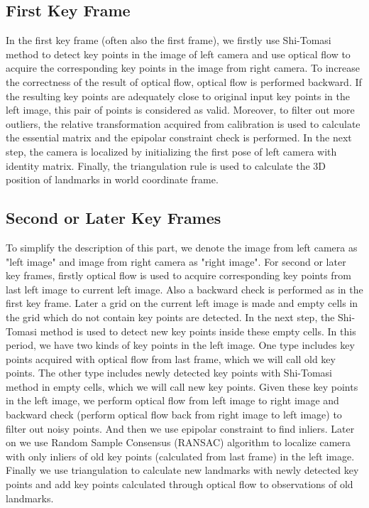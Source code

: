 \documentclass{easychair}
\begin{document}
\subsection{First Key Frame}
In the first key frame (often also the first frame), we firstly use Shi-Tomasi method to detect key points in the image of left camera and use optical flow to acquire the corresponding key points in the image from right camera. To increase the correctness of the result of optical flow, optical flow is performed backward. If the resulting key points are adequately close to original input key points in the left image, this pair of points is considered as valid. Moreover, to filter out more outliers, the relative transformation acquired from calibration is used to calculate the essential matrix and the epipolar constraint check is performed. In the next step, the camera is localized by initializing the first pose of left camera with identity matrix. Finally, the triangulation rule is used to calculate the 3D position of landmarks in world coordinate frame. 

\subsection{Second or Later Key Frames}
To simplify the description of this part, we denote the image from left camera as "left image" and image from right camera as "right image". For second or later key frames, firstly optical flow is used to acquire corresponding key points from last left image to current left image. Also a backward check is performed as in the first key frame. Later a grid on the current left image is made and empty cells in the grid which do not contain key points are detected. In the next step, the Shi-Tomasi method is used to detect new key points inside these empty cells. In this period, we have two kinds of key points in the left image. One type includes key points acquired with optical flow from last frame, which we will call old key points. The other type includes newly detected key points with Shi-Tomasi method in empty cells, which we will call new key points. Given these key points in the left image, we perform optical flow from left image to right image and backward check (perform optical flow back from right image to left image) to filter out noisy points. And then we use epipolar constraint to find inliers. Later on we use Random Sample Consensus (RANSAC) algorithm to localize camera with only inliers of old key points (calculated from last frame) in the left image. Finally we use triangulation to calculate new landmarks with newly detected key points and add key points calculated through optical flow to observations of old landmarks.
\end{document}
